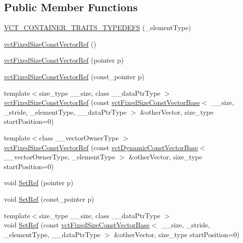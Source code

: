 \subsection*{Public Member Functions}
\begin{DoxyCompactItemize}
\item 
\hyperlink{classvct_fixed_size_const_vector_ref_a69d432ef7afc2c89ca4b4ed675a755cf}{V\-C\-T\-\_\-\-C\-O\-N\-T\-A\-I\-N\-E\-R\-\_\-\-T\-R\-A\-I\-T\-S\-\_\-\-T\-Y\-P\-E\-D\-E\-F\-S} (\-\_\-element\-Type)
\item 
\hyperlink{classvct_fixed_size_const_vector_ref_af19bbe8b3ffb90e3de7f5e127c7db4f7}{vct\-Fixed\-Size\-Const\-Vector\-Ref} ()
\item 
\hyperlink{classvct_fixed_size_const_vector_ref_a7828852fdd5436b0544367dfb5960f7d}{vct\-Fixed\-Size\-Const\-Vector\-Ref} (pointer p)
\item 
\hyperlink{classvct_fixed_size_const_vector_ref_a96326e204add5ab0d61fa65c556bf45c}{vct\-Fixed\-Size\-Const\-Vector\-Ref} (const\-\_\-pointer p)
\item 
{\footnotesize template$<$size\-\_\-type \-\_\-\-\_\-size, class \-\_\-\-\_\-data\-Ptr\-Type $>$ }\\\hyperlink{classvct_fixed_size_const_vector_ref_a3042a429feaf9f1381b14fe0f3c67962}{vct\-Fixed\-Size\-Const\-Vector\-Ref} (const \hyperlink{classvct_fixed_size_const_vector_base}{vct\-Fixed\-Size\-Const\-Vector\-Base}$<$ \-\_\-\-\_\-size, \-\_\-stride, \-\_\-element\-Type, \-\_\-\-\_\-data\-Ptr\-Type $>$ \&other\-Vector, size\-\_\-type start\-Position=0)
\item 
{\footnotesize template$<$class \-\_\-\-\_\-vector\-Owner\-Type $>$ }\\\hyperlink{classvct_fixed_size_const_vector_ref_a404ee3fb6c053895f3d42332268e5298}{vct\-Fixed\-Size\-Const\-Vector\-Ref} (const \hyperlink{classvct_dynamic_const_vector_base}{vct\-Dynamic\-Const\-Vector\-Base}$<$ \-\_\-\-\_\-vector\-Owner\-Type, \-\_\-element\-Type $>$ \&other\-Vector, size\-\_\-type start\-Position=0)
\item 
void \hyperlink{classvct_fixed_size_const_vector_ref_aba8d459ba9af7c3b473e9b557419e968}{Set\-Ref} (pointer p)
\item 
void \hyperlink{classvct_fixed_size_const_vector_ref_a18f517cba227bda39e184053cc384d34}{Set\-Ref} (const\-\_\-pointer p)
\item 
{\footnotesize template$<$size\-\_\-type \-\_\-\-\_\-size, class \-\_\-\-\_\-data\-Ptr\-Type $>$ }\\void \hyperlink{classvct_fixed_size_const_vector_ref_aa9a720a1cd38f40ed7f51e58cc5879d0}{Set\-Ref} (const \hyperlink{classvct_fixed_size_const_vector_base}{vct\-Fixed\-Size\-Const\-Vector\-Base}$<$ \-\_\-\-\_\-size, \-\_\-stride, \-\_\-element\-Type, \-\_\-\-\_\-data\-Ptr\-Type $>$ \&other\-Vector, size\-\_\-type start\-Position=0)

\end{DoxyCompactItemize}
